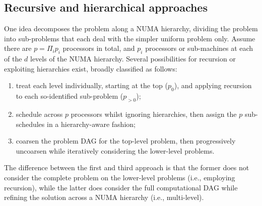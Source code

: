 \documentclass[oneside,reqno, a4paper]{amsart}
\numberwithin{equation}{section}
\begin{document}
\subsection{Recursive and hierarchical approaches}
\label{sec:avoiding-numa}


One idea decomposes the problem along a NUMA hierarchy,
dividing the problem into sub-problems that each deal with the simpler uniform problem only.
Assume there are $p=\Pi_ip_i$ processors in total,
and $p_i$ processors or sub-machines at each of the $d$ levels of the NUMA hierarchy.
Several possibilities for recursion or exploiting hierarchies exist,
broadly classified as follows:
\begin{enumerate}
	\item treat each level individually,
	starting at the top ($p_{0}$),
	and applying recursion to each so-identified sub-problem ($p_{>0}$);
	\item schedule across $p$ processors whilst ignoring hierarchies,
	then assign the $p$ sub-schedules in a hierarchy-aware fashion;
	\item coarsen the problem DAG for the top-level problem,
	then progressively uncoarsen while iteratively considering the lower-level problems. 
\end{enumerate}
The difference between the first and third approach is that the former does not consider the complete problem on the lower-level problems
(i.e., employing recursion),
while the latter does consider the full computational DAG while refining the solution across a NUMA hierarchy
(i.e., multi-level).
\end{document}
